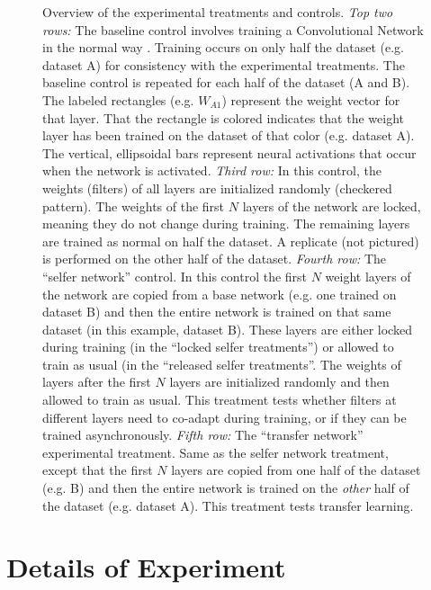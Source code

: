 \begin{figure}[htpb]
\caption{Overview of the experimental treatments and controls. \emph{Top two rows:} The baseline control involves training a Convolutional Network in the normal way \citep{Krizhevsky-2012}. Training occurs on only half the dataset (e.g. dataset A) for consistency with the experimental treatments. The baseline control is repeated for each half of the dataset (A and B). The labeled rectangles (e.g. $W_{A1}$) represent the weight vector for that layer. That the rectangle is colored indicates that the weight layer has been trained on the dataset of that color (e.g. dataset A). The vertical, ellipsoidal bars represent neural activations that occur when the network is activated. \emph{Third row:} In this control, the weights (filters) of all layers are initialized randomly (checkered pattern). The weights of the first $N$ layers of the network are locked, meaning they do not change during training. The remaining layers are trained as normal on half the dataset. A replicate (not pictured) is performed on the other half of the dataset. \emph{Fourth row:} The ``selfer network'' control. In this control the first $N$ weight layers of the network are copied from a base network (e.g. one trained on dataset B) and then the entire network is trained on that same dataset (in this example, dataset B). These layers are either locked during training (in the ``locked selfer treatments'') or allowed to train as usual (in the ``released selfer treatments''. The weights of layers after the first $N$ layers are initialized randomly and then allowed to train as usual. This treatment tests whether filters at different layers need to co-adapt during training, or if they can be trained asynchronously. \emph{Fifth row:} The ``transfer network'' experimental treatment. Same as the selfer network treatment, except that the first $N$ layers are copied from one half of the dataset (e.g. B) and then the entire network is trained on the \emph{other} half of the dataset (e.g. dataset A). This treatment tests transfer learning.}
\label{i}
\end{figure}





\section{Details of Experiment}

